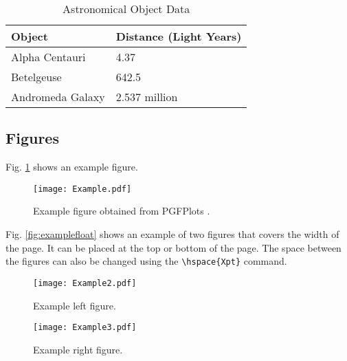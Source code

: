 \documentclass[9pt,a4paper,twocolumn,twoside]{tau-class/tau}
\begin{document}
        \begin{table}[H]
            \centering
            \caption{Astronomical Object Data}
            \label{tab:table}
            \begin{tabular}{ll}
                \toprule
                \textbf{Object} & \textbf{Distance (Light Years)} \\
                \midrule
                Alpha Centauri & 4.37 \\
                Betelgeuse & 642.5 \\
                Andromeda Galaxy & 2.537 million \\
                \bottomrule   
            \end{tabular}
			
			
        \end{table}

    \subsection{Figures}
		
    	Fig. \ref{fig:figure} shows an example figure.
    		
    	\begin{figure}[H]
    		\centering
    		\texttt{[image: Example.pdf]}
    		\caption{Example figure obtained from PGFPlots \cite{PFGPlots}.}
    		\label{fig:figure}
    	\end{figure}
		
        Fig. \ref{fig:examplefloat} shows an example of two figures that covers the width of the page. It can be placed at the top or bottom of the page. The space between the figures can also be changed using the \verb|\hspace{Xpt}| command.
		
        \begin{figure*}[tp] %
		\centering
		  \begin{subfigure}[b]{0.38\linewidth} %
			\texttt{[image: Example2.pdf]}
			\caption{Example left figure.}
			\label{fig:figa}
		\end{subfigure}
			\hspace{20pt}   %
		\begin{subfigure}[b]{0.375\linewidth} %
			\texttt{[image: Example3.pdf]}
			\caption{Example right figure.}
			\label{fig:figb}
		\end{subfigure}
		\caption{Example figure that covers the width of the page obtained from PGFPlots \cite{PFGPlots}.}
		\label{fig:examplefloat}
	\end{figure*}
		
\end{document}

